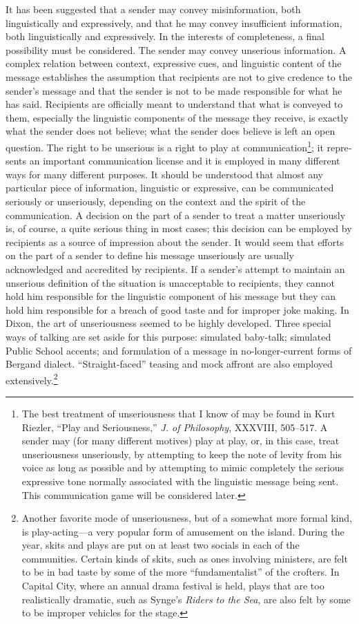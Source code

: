 \documentclass[openany,nobib]{tufte-book}
\begin{document}
It has been suggested that a sender may convey misin­formation, both
linguistically and expressively, and that he may convey insufficient
information, both linguistically and expres­sively. In the interests of
completeness, a final possibility must be considered. The sender may
convey unserious information. A complex relation between context,
expressive cues, and linguis­tic content of the message establishes the
assumption that recipi­ents are not to give credence to the sender's
message and that the sender is not to be made responsible for what he
has said. Recipients are officially meant to understand that what is
con­veyed to them, especially the linguistic components of the mes­sage
they receive, is exactly what the sender does not believe; what the
sender does believe is left an open question. The right to be unserious
is a right to play at communication\footnote{The best treatment of
  unseriousness that I know of may be found in Kurt Riezler, ``Play and
  Seriousness,'' \emph{J. of Philosophy}, XXXVIII, 505--517. A sender
  may (for many different motives) play at play, or, in this case, treat
  unseriousness unseriously, by attempting to keep the note of levity
  from his voice as long as possible and by attempting to mimic
  completely the serious expressive tone normally associated with the
  linguistic message being sent. This communication game will be
  considered later.}; it repre­sents an important communication license
and it is employed in many different ways for many different purposes.
It should be understood that almost any particular piece of information,
linguistic or expressive, can be communicated seriously or unseriously,
depending on the context and the spirit of the communica­tion. A decision
on the part of a sender to treat a matter unseriously is, of course, a
quite serious thing in most cases; this decision can be employed by
recipients as a source of impression about the sender. It would seem
that efforts on the part of a sender to define his message unseriously
are usually acknowledged and accredited by recipients. If a sender's
at­tempt to maintain an unserious definition of the situation is
unacceptable to recipients, they cannot hold him responsible for the
linguistic component of his message but they can hold him responsible
for a breach of good taste and for improper joke­ making. In Dixon, the
art of unseriousness seemed to be highly developed. Three special ways
of talking are set aside for this purpose: simulated baby-talk;
simulated Public School ac­cents; and formulation of a message in
no-longer-current forms of Bergand dialect. ``Straight-faced'' teasing
and mock affront are also employed extensively.\footnote{Another
  favorite mode of unseriousness, but of a some­what more formal kind, is
  play-acting---a very popular form of amusement on the island. During
  the year, skits and plays are put on at least two socials in each of
  the communities. Cer­tain kinds of skits, such as ones involving
  ministers, are felt to be in bad taste by some of the more
  ``fundamentalist'' of the crofters. In Capital City, where an annual
  drama festival is held, plays that are too realistically dramatic,
  such as Synge's \emph{Riders to the Sea}, are also felt by some to be
  improper vehicles for the stage.}
\end{document}
